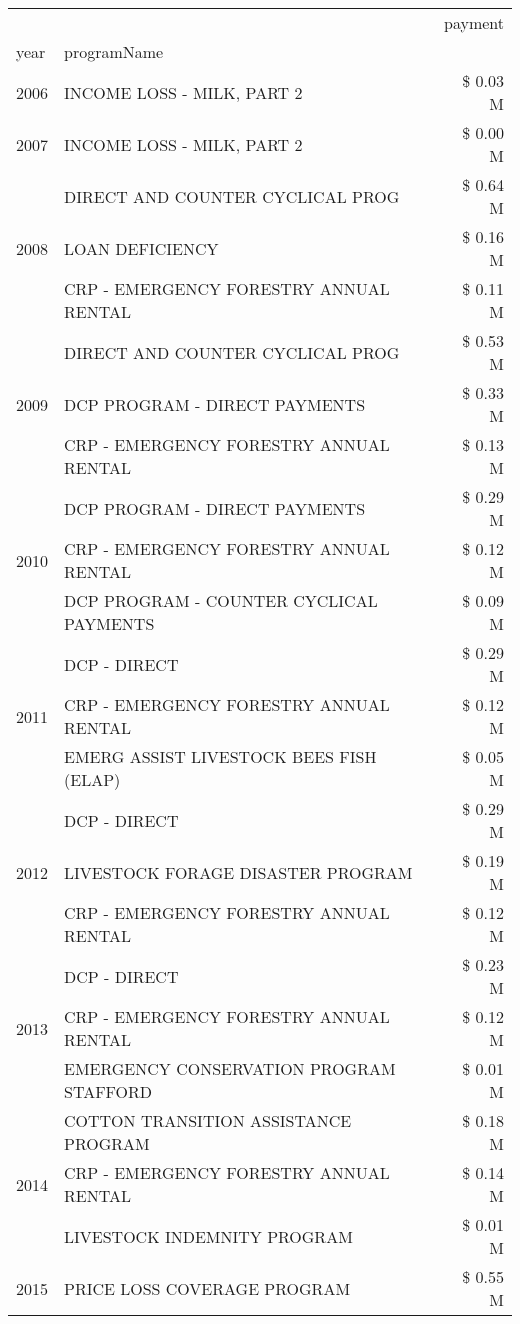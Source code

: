 \begin{tabular}{llr}
\toprule
 &  & payment \\
year & programName &  \\
\midrule
2006 & INCOME LOSS - MILK, PART 2 & \$ 0.03 M \\
\cline{1-3}
2007 & INCOME LOSS - MILK, PART 2 & \$ 0.00 M \\
\cline{1-3}
\multirow[t]{3}{*}{2008} & DIRECT AND COUNTER CYCLICAL PROG & \$ 0.64 M \\
 & LOAN DEFICIENCY & \$ 0.16 M \\
 & CRP - EMERGENCY FORESTRY ANNUAL RENTAL & \$ 0.11 M \\
\cline{1-3}
\multirow[t]{3}{*}{2009} & DIRECT AND COUNTER CYCLICAL PROG & \$ 0.53 M \\
 & DCP PROGRAM - DIRECT PAYMENTS & \$ 0.33 M \\
 & CRP - EMERGENCY FORESTRY ANNUAL RENTAL & \$ 0.13 M \\
\cline{1-3}
\multirow[t]{3}{*}{2010} & DCP PROGRAM - DIRECT PAYMENTS & \$ 0.29 M \\
 & CRP - EMERGENCY FORESTRY ANNUAL RENTAL & \$ 0.12 M \\
 & DCP PROGRAM - COUNTER CYCLICAL PAYMENTS & \$ 0.09 M \\
\cline{1-3}
\multirow[t]{3}{*}{2011} & DCP - DIRECT & \$ 0.29 M \\
 & CRP - EMERGENCY FORESTRY ANNUAL RENTAL & \$ 0.12 M \\
 & EMERG ASSIST LIVESTOCK BEES FISH (ELAP) & \$ 0.05 M \\
\cline{1-3}
\multirow[t]{3}{*}{2012} & DCP - DIRECT & \$ 0.29 M \\
 & LIVESTOCK FORAGE DISASTER PROGRAM & \$ 0.19 M \\
 & CRP - EMERGENCY FORESTRY ANNUAL RENTAL & \$ 0.12 M \\
\cline{1-3}
\multirow[t]{3}{*}{2013} & DCP - DIRECT & \$ 0.23 M \\
 & CRP - EMERGENCY FORESTRY ANNUAL RENTAL & \$ 0.12 M \\
 & EMERGENCY CONSERVATION PROGRAM STAFFORD & \$ 0.01 M \\
\cline{1-3}
\multirow[t]{3}{*}{2014} & COTTON TRANSITION ASSISTANCE PROGRAM & \$ 0.18 M \\
 & CRP - EMERGENCY FORESTRY ANNUAL RENTAL & \$ 0.14 M \\
 & LIVESTOCK INDEMNITY PROGRAM & \$ 0.01 M \\
\cline{1-3}
\multirow[t]{3}{*}{2015} & PRICE LOSS COVERAGE PROGRAM & \$ 0.55 M \\

\end{tabular}

